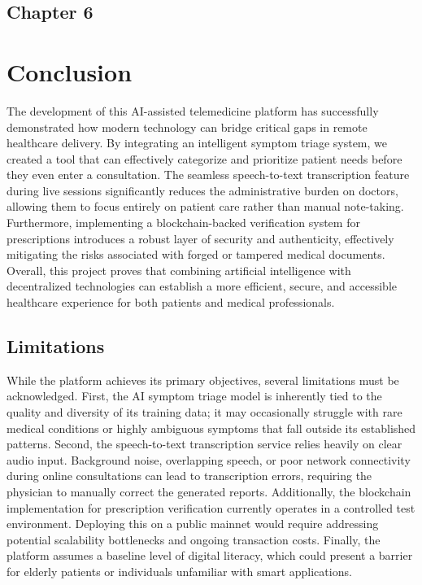 \begin{center}
    \section*{\fontsize{20}{20}\selectfont Chapter 6}
\end{center}
\vspace{10mm}

\section{Conclusion}
The development of this AI-assisted telemedicine platform has successfully demonstrated how modern technology can bridge critical gaps in remote healthcare delivery. By integrating an intelligent symptom triage system, we created a tool that can effectively categorize and prioritize patient needs before they even enter a consultation. The seamless speech-to-text transcription feature during live sessions significantly reduces the administrative burden on doctors, allowing them to focus entirely on patient care rather than manual note-taking. Furthermore, implementing a blockchain-backed verification system for prescriptions introduces a robust layer of security and authenticity, effectively mitigating the risks associated with forged or tampered medical documents. Overall, this project proves that combining artificial intelligence with decentralized technologies can establish a more efficient, secure, and accessible healthcare experience for both patients and medical professionals.

\subsection{Limitations}
While the platform achieves its primary objectives, several limitations must be acknowledged. First, the AI symptom triage model is inherently tied to the quality and diversity of its training data; it may occasionally struggle with rare medical conditions or highly ambiguous symptoms that fall outside its established patterns. Second, the speech-to-text transcription service relies heavily on clear audio input. Background noise, overlapping speech, or poor network connectivity during online consultations can lead to transcription errors, requiring the physician to manually correct the generated reports. Additionally, the blockchain implementation for prescription verification currently operates in a controlled test environment. Deploying this on a public mainnet would require addressing potential scalability bottlenecks and ongoing transaction costs. Finally, the platform assumes a baseline level of digital literacy, which could present a barrier for elderly patients or individuals unfamiliar with smart applications.

